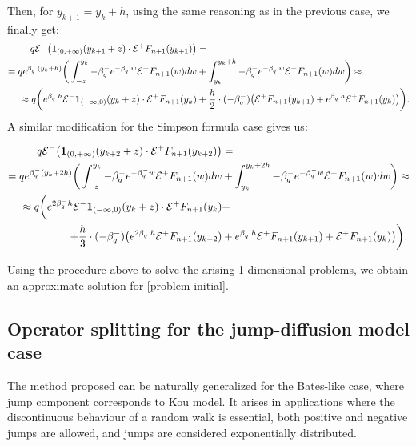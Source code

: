 \documentclass[a4paper]{jpconf}
\begin{document}
{Then, for $y_{k+1} = y_k + h$, using the same reasoning as in the previous case, we finally get:
\begin{align*}
	q \mathcal{E^-} \bigr{(} \mathbf{1}_{(0, +\infty)}(y_{k+1} + z)\cdot \mathcal{E}^+ F_{n+1}(y_{k+1}) \bigr{)} &= \\
	= q e^{\beta^-_{q}(y_k+h)} \biggr{(}\int_{-z}^{y_k} -\beta^-_{q} e^{-\beta^-_{q} w} \mathcal{E}^+ F_{n+1}(w) dw	&+ \int_{y_k}^{y_k + h} - \beta^-_{q} e^{-\beta^-_{q} w} \mathcal{E}^+ F_{n+1}(w) dw \biggr{)} \approx \\
	\approx q \biggr{(} e^{\beta^-_{q}h} \mathcal{E^-} \mathbf{1}_{(-\infty, 0)}(y_{k}+z)\cdot \mathcal{E}^+ F_{n+1}(y_{k}) &+  \frac{h}{2} \cdot (-\beta^-_{q})\bigr{(} \mathcal{E^+}F_{n+1}(y_{k+1}) + e^{\beta^-_{q}h} \mathcal{E}^+F_{n+1}(y_k) \bigr{)}\biggr{)}.\\
\end{align*}
A similar modification for the Simpson formula case gives us:

\begin{align*}
q \mathcal{E^-} \bigr{(} \mathbf{1}_{(0, +\infty)}(y_{k+2} + z)\cdot \mathcal{E}^+ F_{n+1}(y_{k+2}) \bigr{)} &= \\
= q e^{\beta^-_{q}(y_k+2h)} \biggr{(}\int_{-z}^{y_k} -\beta^-_{q} e^{-\beta^-_{q} w} \mathcal{E}^+ F_{n+1}(w) dw	&+ \int_{y_k}^{y_k + 2h} - \beta^-_{q} e^{-\beta^-_{q} w} \mathcal{E}^+ F_{n+1}(w) dw \biggr{)} \approx \\
\approx q \biggr{(} e^{2\beta^-_{q}h} \mathcal{E^-} \mathbf{1}_{(-\infty, 0)}(y_{k}+z)\cdot \mathcal{E}^+ F_{n+1}(y_{k}) &+ \\
+ \frac{h}{3} \cdot (-\beta^-_{q})\bigr{(} e^{2\beta^-_{q}h} \mathcal{E^+}F_{n+1}(y_{k+2}) &+
e^{\beta^-_{q}h}\mathcal{E^+}F_{n+1}(y_{k+1}) +
\mathcal{E}^+F_{n+1}(y_k) \bigr{)}\biggr{)}.
\end{align*}


Using the procedure above to solve the arising 1-dimensional problems, we obtain an approximate solution for \ref{problem-initial}.

\subsection{Operator splitting for the jump-diffusion model case}
The method proposed can be naturally generalized for the Bates-like case, where jump component corresponds to Kou \cite{kou} model. It arises in applications where the discontinuous behaviour of a random walk is essential, both positive and negative jumps are allowed, and jumps are considered exponentially distributed.

}
\end{document}
